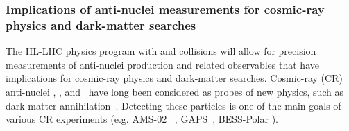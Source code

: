\subsubsection{Implications of anti-nuclei measurements for cosmic-ray physics and dark-matter searches}
\label{sec:astro}

The HL-LHC physics program with \pp and \pPb collisions will allow for precision measurements of anti-nuclei production and related observables that have implications for cosmic-ray physics and dark-matter searches.
Cosmic-ray (CR) anti-nuclei \antip, \antid, and \antihethree~have long been considered as probes of new physics, such as dark matter annihilation~\cite{Donato:1999gy, Baer:2005tw, Donato:2008yx, Brauninger:2009pe, Kadastik:2009ts, Cui:2010ud, Dal:2012my, Ibarra:2012cc, Fornengo:2013osa, Carlson:2014ssa, Aramaki:2015pii,Korsmeier:2017xzj}. Detecting these particles is one of the main goals of various CR experiments (e.g. AMS-02 ~\cite{Giovacchini:2007dwa, kounineHebar}, GAPS~\cite{vonDoetinchem:2015zva, Aramaki:2015laa}, BESS-Polar \cite{Abe:2011nx}). 

